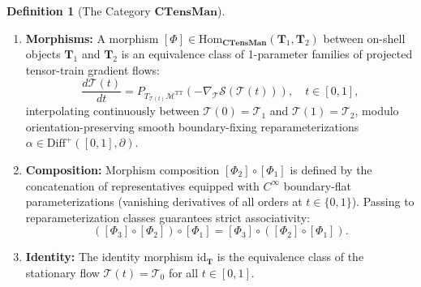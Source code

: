 \documentclass[11pt,a4paper,reqno]{amsart}
\theoremstyle{definition}
\newtheorem{definition}[theorem]{Definition}
\numberwithin{equation}{section}
\newcommand{\CTens}{\mathbf{CTensMan}}
\newcommand{\Tr}{\mathrm{Tr}}
\newcommand{\QFI}{\mathrm{QFI}}
\begin{document}
\begin{definition}[The Category $\CTens$]
\begin{enumerate}[label=(\alph*)]
\begin{itemize}
\begin{align}
        \end{align}
        where $V: \mathrm{End}(\mathbb{C}^\chi) \to \mathrm{Herm}(\mathbb{C}^\chi)$ is an $\mathrm{SU}(\chi)$-invariant Hermitian potential (ensuring $\Tr_\chi(V(\psi)) \in \mathbb{R}$) and $h^{ij} = (g^{\QFI})^{ij}$;
        \item \textbf{On-shell condition:} The induced QFI metric $h_{ij} = g^{\QFI}_{ij}(\mathcal{T})$ and its associated extrinsic curvature $K_{ij}$ satisfy the initial-value ADM constraint equations:
        \begin{equation}
            R[h] + K^2 - K_{ij}K^{ij} = 16\pi G_N \rho_{\mathrm{matt}}[\psi, \pi_\psi], \quad \nabla_j(K^j_i - \delta^j_i K) = 8\pi G_N j_i[\psi, \pi_\psi].
        \end{equation}
    \end{itemize}
    \item \textbf{Morphisms:} A morphism $[\Phi] \in \mathrm{Hom}_{\CTens}(\mathbf{T}_1, \mathbf{T}_2)$ between on-shell objects $\mathbf{T}_1$ and $\mathbf{T}_2$ is an equivalence class of 1-parameter families of projected tensor-train gradient flows:
    \begin{equation}
        \frac{d\mathcal{T}(t)}{dt} = P_{T_{\mathcal{T}(t)}\mathcal{M}^{\mathrm{TT}}} \left( -\nabla_{\mathcal{T}} \mathcal{S}(\mathcal{T}(t)) \right), \quad t \in [0, 1],
    \end{equation}
    interpolating continuously between $\mathcal{T}(0) = \mathcal{T}_1$ and $\mathcal{T}(1) = \mathcal{T}_2$, modulo orientation-preserving smooth boundary-fixing reparameterizations $\alpha \in \mathrm{Diff}^+([0, 1], \partial)$.
    \item \textbf{Composition:} Morphism composition $[\Phi_2] \circ [\Phi_1]$ is defined by the concatenation of representatives equipped with $C^\infty$ boundary-flat parameterizations (vanishing derivatives of all orders at $t \in \{0, 1\}$). Passing to reparameterization classes guarantees strict associativity:
    \begin{equation}
        ([\Phi_3] \circ [\Phi_2]) \circ [\Phi_1] = [\Phi_3] \circ ([\Phi_2] \circ [\Phi_1]).
    \end{equation}
    \item \textbf{Identity:} The identity morphism $\mathrm{id}_{\mathbf{T}}$ is the equivalence class of the stationary flow $\mathcal{T}(t) = \mathcal{T}_0$ for all $t \in [0, 1]$.
\end{enumerate}
\end{definition}
\end{document}
